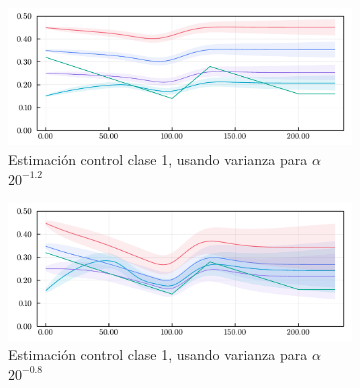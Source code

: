 \begin{figure}[!h]
\begin{subfigure}[b]{0.47\textwidth}
     \centering
     \includegraphics[width=\textwidth]{img/resultados/synth/sensialphacov_alphacov0-027_0alphaini0-15_0-1_0-45_high1_b2real1-88_gereal0-1961_gireal0-1389_acov0-8_aini0-27675_gcov0-05gamma_e_0-1961_gamma_i_0-1389_beta_2_1-8800.pdf}
     \caption{Estimación control clase 1, usando varianza para \(\alpha\) \(20^{-1.2}\)}
     \label{fig:legend-sensi-acov-class1--1-2}
\end{subfigure} 
\hfill
\begin{subfigure}[b]{0.47\textwidth}
     \centering
     \includegraphics[width=\textwidth]{img/resultados/synth/sensialphacov_alphacov0-091_0alphaini0-15_0-1_0-45_high1_b2real1-88_gereal0-1961_gireal0-1389_acov0-8_aini0-27675_gcov0-05gamma_e_0-1961_gamma_i_0-1389_beta_2_1-8800.pdf}
     \caption{Estimación control clase 1, usando varianza para \(\alpha\) \(20^{-0.8}\)}
     \label{fig:legend-sensi-acov-class1--0-8}
\end{subfigure} 
\hfill
\begin{subfigure}[b]{0.47\textwidth}
     \centering

\end{subfigure}
\end{figure}
